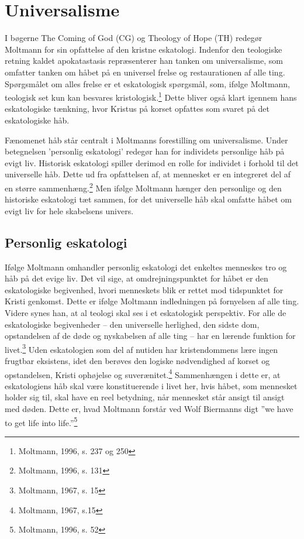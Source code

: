 \chapter{Universalisme}
I bøgerne The Coming of God (CG) og Theology of Hope (TH) redegør Moltmann for sin opfattelse af den kristne eskatologi. Indenfor den teologiske retning kaldet apokatastasis repræsenterer han tanken om universalisme, som omfatter tanken om håbet på en universel frelse og restaurationen af alle ting. Spørgsmålet om alles frelse er et eskatologisk spørgsmål, som, ifølge Moltmann, teologisk set kun kan besvares kristologisk.\footnote{Moltmann, 1996, s. 237 og 250} Dette bliver også klart igennem hans eskatologiske tænkning, hvor Kristus på korset opfattes som svaret på det eskatologiske håb.

Fænomenet håb står centralt i Moltmanns forestilling om universalisme. Under betegnelsen 'personlig eskatologi' redegør han for individets personlige håb på evigt liv. Historisk eskatologi spiller derimod en rolle for individet i forhold til det universelle håb. Dette ud fra opfattelsen af, at mennesket er en integreret del af en større sammenhæng.\footnote{Moltmann, 1996, s. 131} Men ifølge Moltmann hænger den personlige og den historiske eskatologi tæt sammen, for det universelle håb skal omfatte håbet om evigt liv for hele skabelsens univers.  

\section{Personlig eskatologi}
Ifølge Moltmann omhandler personlig eskatologi det enkeltes menneskes tro og håb på det evige liv. Det
vil sige, at omdrejningspunktet for håbet er den eskatologiske begivenhed, hvori menneskets blik er rettet mod tidspunktet for Kristi genkomst. Dette er ifølge Moltmann indledningen på fornyelsen af alle ting. Videre synes han, at al teologi skal ses i et eskatologisk perspektiv. For alle de eskatologiske begivenheder -- den universelle herlighed, den sidste dom, opstandelsen af de døde og nyskabelsen af alle ting -- har en lærende funktion for livet.\footnote{Moltmann, 1967, s. 15} Uden eskatologien som del af nutiden har kristendommens lære ingen frugtbar eksistens, idet den berøves den logiske nødvendighed af korset og opstandelsen, Kristi ophøjelse og suverænitet.\footnote{Moltmann, 1967, s.15 } Sammenhængen i dette er, at eskatologiens håb skal være konstituerende i livet her, hvis håbet, som mennesket holder sig til, skal have en reel betydning, når mennesket står ansigt til ansigt med døden. Dette er, hvad Moltmann forstår ved Wolf Biermanns digt ”we have to get life into life.”\footnote{Moltmann, 1996, s. 52}

